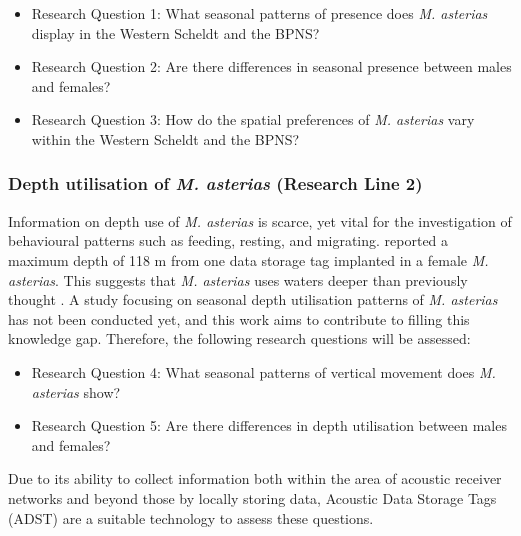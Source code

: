\documentclass[
  authoryear,
  review,
  3p]{elsarticle}
\providecommand{\tightlist}{%
  \setlength{\itemsep}{0pt}\setlength{\parskip}{0pt}}\usepackage{longtable,booktabs,array}
\begin{document}
\begin{itemize}
\tightlist
\item
  Research Question 1: What seasonal patterns of presence does \emph{M.
  asterias} display in the Western Scheldt and the BPNS?
\item
  Research Question 2: Are there differences in seasonal presence
  between males and females?
\item
  Research Question 3: How do the spatial preferences of \emph{M.
  asterias} vary within the Western Scheldt and the BPNS?
\end{itemize}

\hypertarget{depth-utilisation-of-m.-asterias-research-line-2}{%
\subsubsection*{\texorpdfstring{Depth utilisation of \emph{M. asterias}
(Research Line
2)}{Depth utilisation of M. asterias (Research Line 2)}}\label{depth-utilisation-of-m.-asterias-research-line-2}}

Information on depth use of \emph{M. asterias} is scarce, yet vital for
the investigation of behavioural patterns such as feeding, resting, and
migrating. \citet{griffiths_2020} reported a maximum depth of 118 m from
one data storage tag implanted in a female \emph{M. asterias}. This
suggests that \emph{M. asterias} uses waters deeper than previously
thought \citep[depths \textless100 m,][]{ices_2019}. A study focusing on
seasonal depth utilisation patterns of \emph{M. asterias} has not been
conducted yet, and this work aims to contribute to filling this
knowledge gap. Therefore, the following research questions will be
assessed:

\begin{itemize}
\tightlist
\item
  Research Question 4: What seasonal patterns of vertical movement does
  \emph{M. asterias} show?
\item
  Research Question 5: Are there differences in depth utilisation
  between males and females?
\end{itemize}

Due to its ability to collect information both within the area of
acoustic receiver networks and beyond those by locally storing data,
Acoustic Data Storage Tags (ADST) are a suitable technology to assess
these questions.
\end{document}
